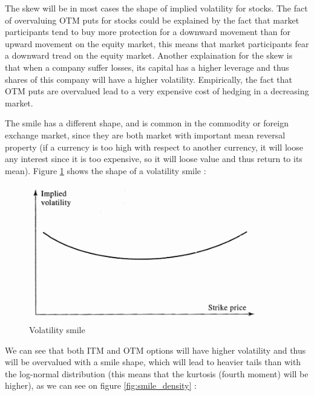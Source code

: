 \documentclass[hidelinks]{article}
\theoremstyle{definition}
\begin{document}
    The skew will be in most cases the shape of implied volatility for stocks. The fact of overvaluing OTM puts for stocks could be explained by the fact that market participants tend to buy more protection for a downward movement than for upward movement on the equity market, this means that market participants fear a downward tread on the equity market. Another explaination for the skew is that when a company suffer losses, its capital has a higher leverage and thus shares of this company will have a higher volatility. Empirically, the fact that OTM puts are overvalued lead to a very expensive cost of hedging in a decreasing market.
    \newline
    
    The smile has a different shape, and is common in the commodity or foreign exchange market, since they are both market with important mean reversal property (if a currency is too high with respect to another currency, it will loose any interest since it is too expensive, so it will loose value and thus return to its mean). Figure \ref{fig:smile} shows the shape of a volatility smile :
    
    \begin{figure}[!h]
	\centering
	\includegraphics[width=0.9\textwidth]{smile.png}
    \caption{Volatility smile}
    \label{fig:smile}
    \end{figure}
    
    
    
    We can see that both ITM and OTM options will have higher volatility and thus will be overvalued with a smile shape, which will lead to heavier tails than with the log-normal distribution (this means that the kurtosis (fourth moment) will be higher), as we can see on figure \ref{fig:smile_density} :
    
\end{document}

